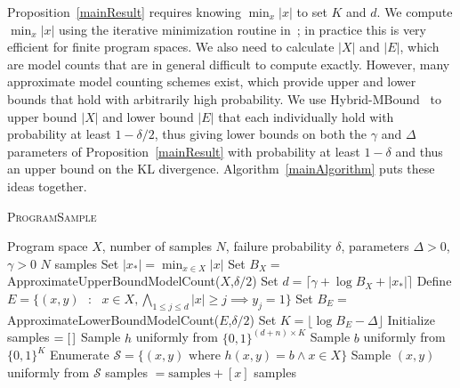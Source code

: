 \documentclass{article}
\newcommand{\theSystem}{\textsc{ProgramSample}}
\begin{document}
  

  Proposition~\ref{mainResult} requires knowing $\min_x \lvert x \rvert $ to set $K$ and $d$. We compute $\min_x \lvert x \rvert $ using the iterative minimization routine in~\cite{singh2013automated}; in practice this is very efficient for finite program spaces. We also need to calculate $|X|$ and $|E|$, which are model counts that are in general difficult to compute exactly.
  However, many approximate model counting schemes exist, which provide upper and lower bounds that hold with arbitrarily high probability.
  We use Hybrid-MBound~\cite{gomes2006model} to upper bound $|X|$ and lower bound $|E|$ that each individually hold with probability at least $1-\delta / 2$, thus
  giving lower bounds on both the $\gamma$ and $\Delta$ parameters of Proposition~\ref{mainResult} with probability at least $1-\delta$
  and thus an upper bound on the KL divergence.
  Algorithm~\ref{mainAlgorithm} puts these ideas together.

   
  \begin{algorithm}[tb]
   \caption{\theSystem{}}
   \label{mainAlgorithm}
\begin{algorithmic}
   Program space $X$, number of samples $N$, failure probability $\delta$, parameters $\Delta > 0$, $\gamma > 0$
   $N$ samples 
  \STATE Set $\lvert x_* \rvert  = \min_{x\in X} \lvert x \rvert $
  \STATE Set $B_X = $ ApproximateUpperBoundModelCount($X$,$\delta/2$)
  \STATE Set $d = \lceil \gamma + \log B_X + |x_* |\rceil$
  \STATE Define $E = \{(x,y) \text{ }:\text{ } x\in X,  \bigwedge_{1\leq j \leq d}  \lvert x \rvert \geq j\implies y_j=1 \}$
  \STATE Set $B_E = $ ApproximateLowerBoundModelCount($E$,$\delta/2$)
  \STATE Set $K = \lfloor \log B_E - \Delta \rfloor $
  \STATE Initialize samples $ = [\hspace{0.05cm}]$
  \REPEAT
  \STATE Sample $h$ uniformly from $\{0,1\}^{(d+n)\times K}$
  \STATE Sample $b$ uniformly from $\{0,1\}^{K}$
  \STATE Enumerate $\mathcal{S} = \{ (x,y) \text{ where } h(x,y) = b \wedge x\in X\}$
  \STATE Sample $(x,y)$ uniformly from $\mathcal{S}$
  \STATE samples $ = \text{samples}+ [x]$
  \ENDIF
   \ENDIF
    samples
\end{algorithmic}
  \end{algorithm}
\end{document}
